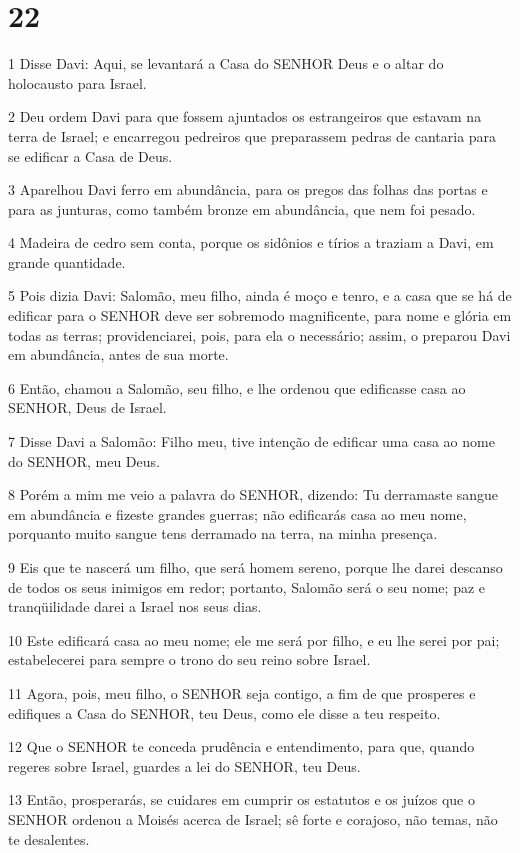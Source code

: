 \chapter{22}

\par 1 Disse Davi: Aqui, se levantará a Casa do SENHOR Deus e o altar do holocausto para Israel.
\par 2 Deu ordem Davi para que fossem ajuntados os estrangeiros que estavam na terra de Israel; e encarregou pedreiros que preparassem pedras de cantaria para se edificar a Casa de Deus.
\par 3 Aparelhou Davi ferro em abundância, para os pregos das folhas das portas e para as junturas, como também bronze em abundância, que nem foi pesado.
\par 4 Madeira de cedro sem conta, porque os sidônios e tírios a traziam a Davi, em grande quantidade.
\par 5 Pois dizia Davi: Salomão, meu filho, ainda é moço e tenro, e a casa que se há de edificar para o SENHOR deve ser sobremodo magnificente, para nome e glória em todas as terras; providenciarei, pois, para ela o necessário; assim, o preparou Davi em abundância, antes de sua morte.
\par 6 Então, chamou a Salomão, seu filho, e lhe ordenou que edificasse casa ao SENHOR, Deus de Israel.
\par 7 Disse Davi a Salomão: Filho meu, tive intenção de edificar uma casa ao nome do SENHOR, meu Deus.
\par 8 Porém a mim me veio a palavra do SENHOR, dizendo: Tu derramaste sangue em abundância e fizeste grandes guerras; não edificarás casa ao meu nome, porquanto muito sangue tens derramado na terra, na minha presença.
\par 9 Eis que te nascerá um filho, que será homem sereno, porque lhe darei descanso de todos os seus inimigos em redor; portanto, Salomão será o seu nome; paz e tranqüilidade darei a Israel nos seus dias.
\par 10 Este edificará casa ao meu nome; ele me será por filho, e eu lhe serei por pai; estabelecerei para sempre o trono do seu reino sobre Israel.
\par 11 Agora, pois, meu filho, o SENHOR seja contigo, a fim de que prosperes e edifiques a Casa do SENHOR, teu Deus, como ele disse a teu respeito.
\par 12 Que o SENHOR te conceda prudência e entendimento, para que, quando regeres sobre Israel, guardes a lei do SENHOR, teu Deus.
\par 13 Então, prosperarás, se cuidares em cumprir os estatutos e os juízos que o SENHOR ordenou a Moisés acerca de Israel; sê forte e corajoso, não temas, não te desalentes.
